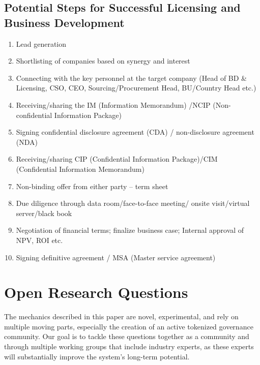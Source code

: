 \documentclass[12pt,letterpaper]{article}
\begin{document}
\subsection{Potential Steps for Successful Licensing and Business Development}
\begin{enumerate}
\item Lead generation
\item Shortlisting of companies based on synergy and interest
\item Connecting with the key personnel at the target company (Head of BD \& Licensing, CSO, CEO, Sourcing/Procurement Head, BU/Country Head etc.)
\item Receiving/sharing the IM (Information Memorandum) /NCIP (Non-confidential Information Package)
\item Signing confidential disclosure agreement (CDA) / non-disclosure agreement (NDA)
\item Receiving/sharing CIP (Confidential Information Package)/CIM (Confidential Information Memorandum)
\item Non-binding offer from either party – term sheet
\item Due diligence through data room/face-to-face meeting/ onsite visit/virtual server/black book
\item Negotiation of financial terms; finalize business case; Internal approval of NPV, ROI etc.
\item Signing definitive agreement / MSA (Master service agreement)
\end{enumerate}

\section{Open Research Questions}
The mechanics described in this paper are novel, experimental, and rely on multiple moving parts, especially the creation of an active tokenized governance community. Our goal is to tackle these questions together as a community and through multiple working groups that include industry experts, as these experts will substantially improve the system’s long-term potential.
\end{document}
